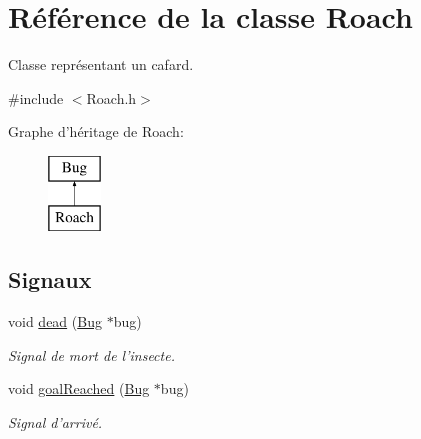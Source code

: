 \hypertarget{classRoach}{
\section{Référence de la classe Roach}
\label{classRoach}
}


Classe représentant un cafard.  




{\ttfamily \#include $<$Roach.h$>$}

Graphe d'héritage de Roach:\begin{figure}[H]
\begin{center}
\leavevmode
\includegraphics[height=2.000000cm]{classRoach}
\end{center}
\end{figure}
\subsection*{Signaux}
\begin{DoxyCompactItemize}
\item 
void \hyperlink{classBug_ab7379f5a0172e2d536e20f3f29915e02}{dead} (\hyperlink{classBug}{Bug} $\ast$bug)
\begin{DoxyCompactList}\small\item\em Signal de mort de l'insecte. \end{DoxyCompactList}\item 
void \hyperlink{classBug_a33f90dffa55e1dce80dc2416c75a53c8}{goalReached} (\hyperlink{classBug}{Bug} $\ast$bug)
\begin{DoxyCompactList}\small\item\em Signal d'arrivé. \end{DoxyCompactList}\end{DoxyCompactItemize}
